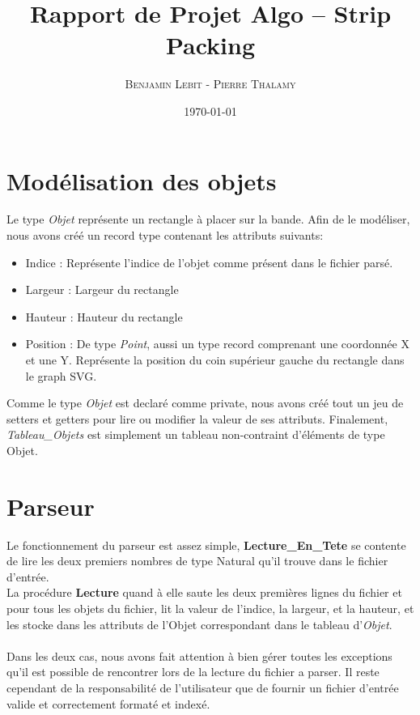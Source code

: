 \documentclass{article}
\title{Rapport de Projet Algo -- Strip Packing}
\author{\textsc{Benjamin Lebit} - \textsc{Pierre Thalamy}}
\date{\today}
\begin{document}
\maketitle

\section {Modélisation des objets}
Le type \textit{Objet} représente un rectangle à placer sur la bande. 
Afin de le modéliser, nous avons créé un record type contenant 
les attributs suivants:
\begin{itemize}
  \item Indice : Représente l'indice de l'objet comme présent dans le fichier 
    parsé.
  \item Largeur : Largeur du rectangle
  \item Hauteur : Hauteur du rectangle
  \item Position : De type \textit{Point}, aussi un type record comprenant une 
    coordonnée X et une Y. 
    Représente la position du coin supérieur gauche du rectangle dans le graph SVG.
\end{itemize}

Comme le type \textit{Objet} est declaré comme private, nous avons créé tout un jeu de setters et getters pour lire ou modifier la valeur de ses attributs.
Finalement, \textit{Tableau\_Objets} est simplement un tableau non-contraint d'éléments de type Objet.

\section {Parseur}
Le fonctionnement du parseur est assez simple, \textbf{Lecture\_En\_Tete} se contente de lire les deux premiers nombres de type Natural qu'il trouve dans le fichier d'entrée. \\
La procédure \textbf{Lecture} quand à elle saute les deux premières lignes du fichier et pour tous les objets du fichier, lit la valeur de l'indice, la largeur, et la hauteur, et les stocke dans les attributs de l'Objet correspondant dans le tableau 
d'\textit{Objet}.
\paragraph{} Dans les deux cas, nous avons fait attention à bien gérer toutes les exceptions qu'il est possible de rencontrer lors de la lecture du fichier a parser. Il reste cependant de la responsabilité de l'utilisateur que de fournir un fichier d'entrée valide et correctement formaté et indexé.
\newpage
\end{document}
